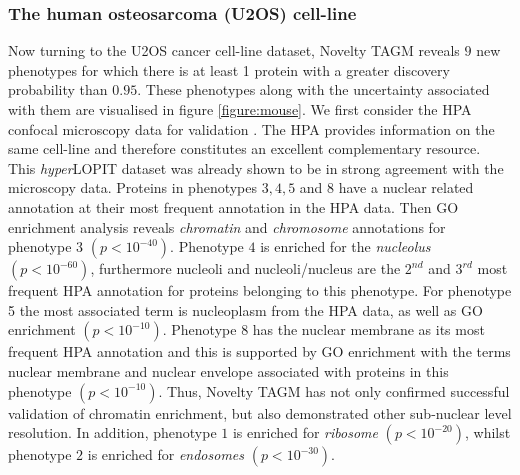 \documentclass[12pt,english]{article}
\begin{document}
\subsubsection{The human osteosarcoma (U2OS) cell-line}
Now turning to the U2OS cancer cell-line dataset, Novelty TAGM reveals $9$ new phenotypes for which there is at least 1 protein with a greater discovery probability than $0.95$. These phenotypes along with the uncertainty associated with them are visualised in figure \ref{figure:mouse}. We first consider the HPA confocal microscopy data for validation \citep{Thul:2017, Sullivan:2018}. The HPA provides information on the same cell-line and therefore constitutes an excellent complementary resource. This \textit{hyper}LOPIT dataset was already shown to be in strong agreement with the microscopy data. Proteins in phenotypes $3,4,5$ and $8$ have a nuclear related annotation at their most frequent annotation in the HPA data. Then GO enrichment analysis reveals \textit{chromatin} and \textit{chromosome} annotations for phenotype 3 $(p < 10^{-40})$. Phenotype $4$ is enriched for the \textit{nucleolus} $(p < 10^{-60})$, furthermore nucleoli and nucleoli/nucleus are the $2^{nd}$ and $3^{rd}$ most frequent HPA annotation for proteins belonging to this phenotype. For phenotype 5 the most associated term is nucleoplasm from the HPA data, as well as GO enrichment $(p < 10^{-10})$. Phenotype $8$ has the nuclear membrane as its most frequent HPA annotation and this is supported by GO enrichment with the terms nuclear membrane and nuclear envelope associated with proteins in this phenotype $(p < 10^{-10})$. Thus, Novelty TAGM has not only confirmed successful validation of chromatin enrichment, but also demonstrated other sub-nuclear level resolution. In addition, phenotype $1$ is enriched for \textit{ribosome} $( p < 10^{-20})$, whilst phenotype $2$ is enriched for \textit{endosomes} $(p < 10^{-30})$.
\end{document}
